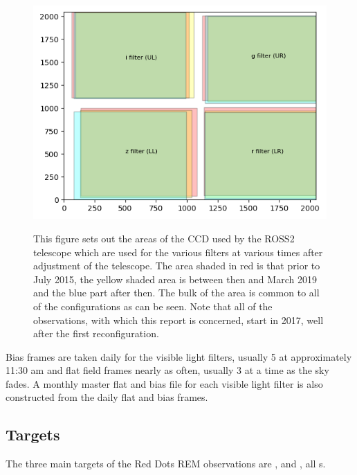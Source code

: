 \begin{figure}[!htbp]
\begin{center}
\includegraphics[scale=1]{images/showusedccd.png} \\
\end{center}   
\caption{This figure sets out the areas of the CCD used by the ROSS2
telescope which are used for the various filters at various times after
adjustment of the telescope. The area shaded in red is that prior to July 2015, the yellow shaded area is between
then and March 2019 and the blue part after then. The bulk of the area is
common to all of the configurations as can be seen. Note that all of the
{\rdwarf} observations, with which this report is concerned, start in 2017, well
after the first reconfiguration.} \protect\label{fig:showusedccd}
\end{figure}

Bias frames are taken daily for the visible light filters, usually 5 at
approximately 11:30 am and flat field frames nearly as often, usually 3 at a
time as the sky fades. A monthly master flat and bias file for each visible
light filter is also constructed from the daily flat and bias frames.

\subsection{Targets}
\protect\label{section:targets}

The three main targets of the Red Dots REM observations are \prox, {\bstar} and
\ross, all \rdwarf s.

